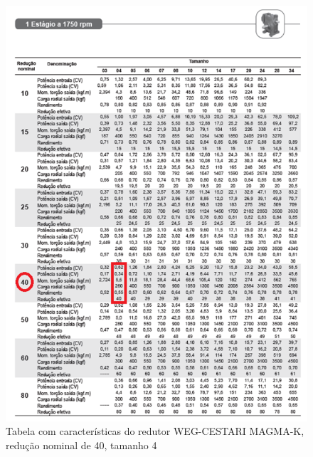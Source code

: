 \begin{anexosenv}
\begin{figure}[!ht]
	\centering
		\includegraphics[scale=0.6]{figuras/estrutura/anexos/15.png}
	\caption{Tabela com características do redutor WEG-CESTARI MAGMA-K, redução nominal de 40, tamanho 4}
\end{figure}


\end{anexosenv}
